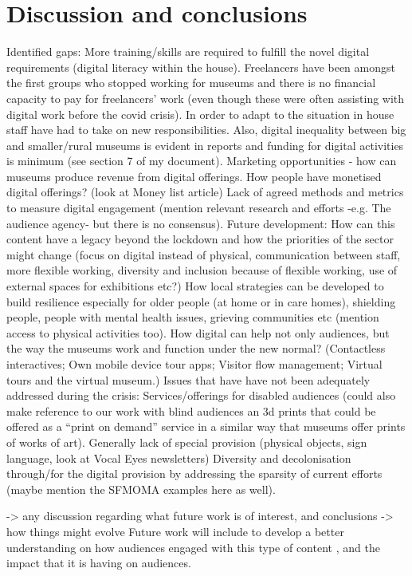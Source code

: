 \documentclass{egpubl}
\begin{document}
\section{Discussion and conclusions}
Identified gaps:
More training/skills are required to fulfill the novel digital requirements (digital literacy within the house). Freelancers have been amongst the first groups who stopped working for museums and there is no financial capacity to pay for freelancers' work (even though these were often assisting with digital work before the covid crisis). In order to adapt to the situation in house staff have had to take on new responsibilities. Also, digital inequality between big and smaller/rural museums is evident in reports and funding for digital activities is minimum (see section 7 of my document).
Marketing opportunities  - how can museums produce revenue from digital offerings. How people have monetised digital offerings? (look at Money list article)
Lack of agreed methods and metrics to measure digital engagement (mention relevant research and efforts -e.g. The audience agency- but there is no consensus).
Future development:
How can this content have a legacy beyond the lockdown and how the priorities of the sector might change (focus on digital instead of physical, communication between staff, more flexible working, diversity and inclusion because of flexible working, use of external spaces for exhibitions etc?)
How local strategies can be developed to build resilience especially for older people (at home or in care homes), shielding people, people with mental health issues, grieving communities etc (mention access to physical activities too). 
How digital can help not only audiences, but the way the museums work and function under the new normal? (Contactless interactives; Own mobile device tour apps; Visitor flow management; Virtual tours and the virtual museum.)
Issues that have have not been adequately addressed during the crisis:
Services/offerings for disabled audiences (could also make reference to our work with blind audiences an 3d prints that could be offered as a “print on demand” service in a similar way that museums offer prints of works of art). Generally lack of special provision (physical objects, sign language, look at Vocal Eyes newsletters)
Diversity and decolonisation through/for the digital provision by addressing the sparsity of current efforts (maybe mention the SFMOMA examples here as well).

-> any discussion regarding what future work is of interest, and conclusions
->  how things might evolve
Future work will include to develop a better  understanding on how audiences engaged with this type of content  , and the impact that it is having on audiences. 
\end{document}
